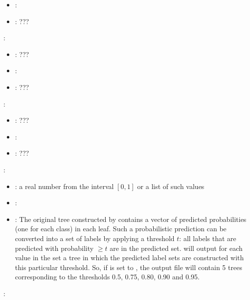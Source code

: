 \begin{itemize}
{\begin{itemize}
                \item \optionDefaultValue{}: 
                \item \optionDescrption{}: ???
           \end{itemize}
    \item {}:
           \begin{itemize}
                \item \optionPossibleValues{}: ???
                \item \optionDefaultValue{}: 
                \item \optionDescrption{}: ???
           \end{itemize}
    \item {}:
           \begin{itemize}
                \item \optionPossibleValues{}: ???
                \item \optionDefaultValue{}: 
                \item \optionDescrption{}: ???
           \end{itemize}
       }
    \item {}:
           \begin{itemize}
                \item \optionPossibleValues{}: a real number from the interval $[0, 1]$ or a list of such values
                \item \optionDefaultValue{}: 
                \item \optionDescrption{}:  The original tree constructed by \clus{} contains a vector of predicted probabilities (one for each class) in each leaf.
                Such a probabilistic prediction can be converted into a set of labels by applying a threshold $t$: all labels that are predicted with probability $\geq t$ are in the predicted set.
                \clus{} will output for each value in the set a tree in which the predicted label sets are constructed with this particular threshold.
                So, if  is set to \formatOneElement{[0.5, 0.75, 0.80, 0.90, 0.95]}, the output file will contain 5 trees corresponding to the thresholds 0.5, 0.75, 0.80, 0.90 and 0.95.
           \end{itemize}
    \item {}:

\end{itemize}
